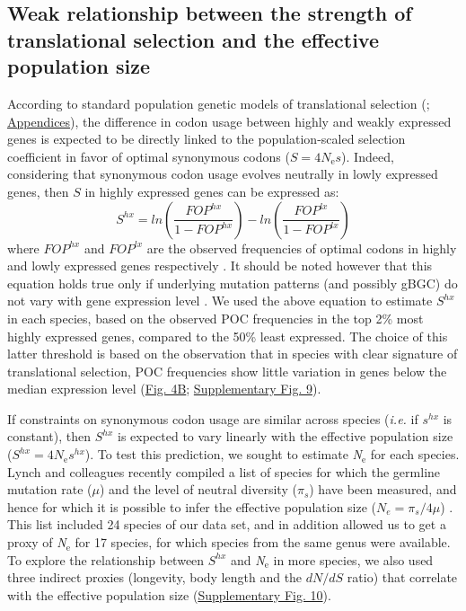 \subsection{Weak relationship between the strength of translational selection and the effective population size}

According to standard population genetic models of translational selection (\citet{bulmer_selection-mutation-drift_1991, sharp_variation_2005, dos_reis_estimating_2009}; \hyperref[appendices]{Appendices}), the difference in codon usage between highly and weakly expressed genes is expected to be directly linked to the population-scaled selection coefficient in favor of optimal synonymous codons ($S=4\textit{N}_{\text{e}}s$). Indeed, considering that synonymous codon usage evolves neutrally in lowly expressed genes, then $S$ in highly expressed genes can be expressed as: \begin{equation}S^{hx}=ln(\frac{FOP^{hx}}{1-FOP^{hx}})-ln(\frac{FOP^{lx}}{1-FOP^{lx}})\end{equation} where $FOP^{hx}$ and $FOP^{lx}$ are the observed frequencies of optimal codons in highly and lowly expressed genes respectively \citep{sharp_variation_2005, dos_reis_estimating_2009}. It should be noted however that this equation holds true only if underlying mutation patterns (and possibly gBGC) do not vary with gene expression level \citep{sharp_variation_2005, dos_reis_estimating_2009}. We used the above equation to estimate $S^{hx}$ in each species, based on the observed POC frequencies in the top 2\% most highly expressed genes, compared to the 50\% least expressed. The choice of this latter threshold is based on the observation that in species with clear signature of translational selection, POC frequencies show little variation in genes below the median expression level (\hyperref[fig:CU4]{Fig. 4B}; \hyperref[suppfig:CU9]{Supplementary Fig. 9}). 

If constraints on synonymous codon usage are similar across species (\textit{i.e.} if $s^{hx}$ is constant), then $S^{hx}$ is expected to vary linearly with the effective population size ($S^{hx}=4\textit{N}_{\text{e}}s^{hx}$). To test this prediction, we sought to estimate \textit{N}$_{\text{e}}$ for each species. Lynch and colleagues recently compiled a list of species for which the germline mutation rate ($\mu$) and the level of neutral diversity ($\pi_s$) have been measured, and hence for which it is possible to infer the effective population size ($N_{e}=\pi_{s}/4\mu$) \citep{lynch_divergence_2023}. This list included 24 species of our data set, and in addition allowed us to get a proxy of \textit{N}$_{\text{e}}$ for 17 species, for which species from the same genus were available. To explore the relationship between $S^{hx}$ and \textit{N}$_{\text{e}}$ in more species, we also used three indirect proxies (longevity, body length and the ${dN}/{dS}$ ratio) that correlate with the effective population size (\hyperref[suppfig:CU10]{Supplementary Fig. 10}). 

